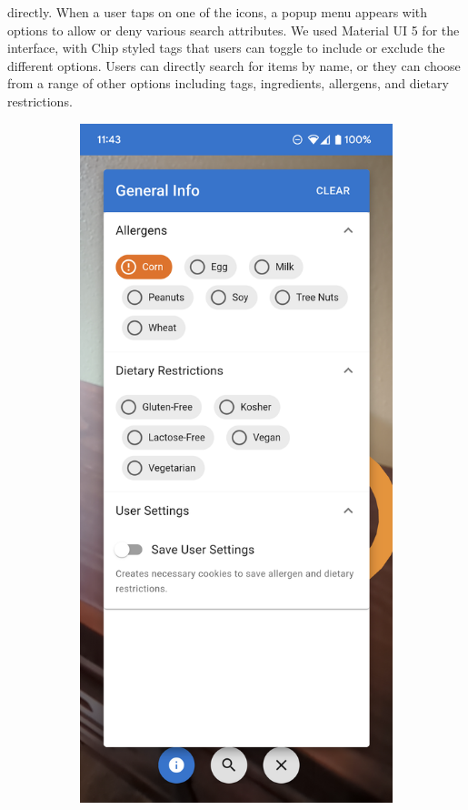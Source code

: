 \documentclass[thesis]{fputhesis}
\begin{document}
\begin{body}
 directly. When a user taps on one of the icons, a popup menu appears with options to allow or deny various search attributes. %
\filbreak
We used Material UI 5 for the interface, with Chip styled tags that users can toggle to include or exclude the different options. Users can directly search for items by name, or they can choose from a range of other options including tags, ingredients, allergens, and dietary restrictions. 
\begin{figure}[h!]
    \centering
    \begin{subfigure}[]{0.45\textwidth}
        \includegraphics[width=\textwidth]{Images/info-ui.png}

\end{subfigure}
\end{figure}
\end{body}
\end{document}
